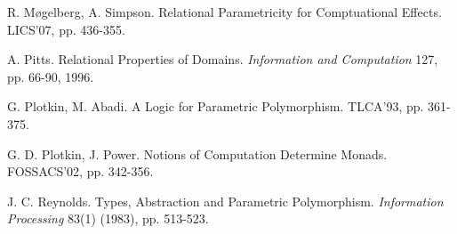\documentclass[a4paper,11pt]{article}
\begin{document}
{\begin{thebibliography}{}
\begin{multicols}{2}
R. M{\o}gelberg, A. Simpson. Relational Parametricity for
Comptuational Effects. LICS'07, pp. 436-355.



A. Pitts. Relational Properties of Domains. {\em Information and
  Computation} 127, pp. 66-90, 1996.

G. Plotkin, M. Abadi. A Logic for Parametric
Polymorphism. TLCA'93, %
pp. 361-375. %

G. D. Plotkin, J. Power. Notions of Computation Determine
Monads. FOSSACS'02,
pp. 342-356. %


 J. C. Reynolds. Types, Abstraction and Parametric
  Polymorphism. {\em Information Processing} 83(1) (1983), pp. 513-523.









\end{multicols}
\end{thebibliography}

}
\end{document}
